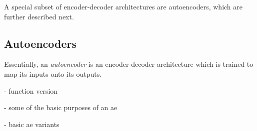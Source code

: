 A special subset of encoder-decoder architectures are autoencoders, which are further described next.

\subsection{Autoencoders}

Essentially, an \textit{autoencoder} is an encoder-decoder architecture which is trained to map its inputs onto its outputs.

- function version

- some of the basic purposes of an ae

- basic ae variants 


\clearpage



